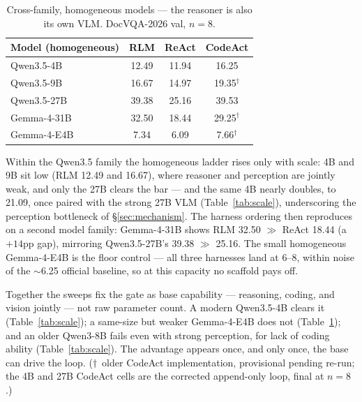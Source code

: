 \begin{table}[t]
\centering
\small
\begin{tabular}{lccc}
\toprule
Model (homogeneous) & RLM & ReAct & CodeAct \\
\midrule
Qwen3.5-4B & 12.49 & 11.94 & 16.25 \\
Qwen3.5-9B & 16.67 & 14.97 & 19.35$^\dag$ \\
Qwen3.5-27B & 39.38 & 25.16 & 39.53 \\
Gemma-4-31B & 32.50 & 18.44 & 29.25$^\dag$ \\
Gemma-4-E4B & 7.34 & 6.09 & 7.66$^\dag$ \\
\bottomrule
\end{tabular}
\caption{Cross-family, homogeneous models --- the reasoner is also its own VLM. DocVQA-2026 val, $n{=}8$.}
\label{tab:family}
\end{table}

Within the Qwen3.5 family the homogeneous ladder rises only with scale: 4B and 9B sit low (RLM 12.49 and 16.67), where reasoner and perception are jointly weak, and only the 27B clears the bar --- and the same 4B nearly doubles, to 21.09, once paired with the strong 27B VLM (Table~\ref{tab:scale}), underscoring the perception bottleneck of \S\ref{sec:mechanism}. The harness ordering then reproduces on a second model family: Gemma-4-31B shows RLM 32.50 $\gg$ ReAct 18.44 (a $+14$pp gap), mirroring Qwen3.5-27B's 39.38 $\gg$ 25.16. The small homogeneous Gemma-4-E4B is the floor control --- all three harnesses land at 6--8, within noise of the $\sim$6.25 official baseline, so at this capacity no scaffold pays off.

Together the sweeps fix the gate as base capability --- reasoning, coding, and vision jointly --- not raw parameter count. A modern Qwen3.5-4B clears it (Table~\ref{tab:scale}); a same-size but weaker Gemma-4-E4B does not (Table~\ref{tab:family}); and an older Qwen3-8B fails even with strong perception, for lack of coding ability (Table~\ref{tab:scale}). The advantage appears once, and only once, the base can drive the loop. ($\dag$~older CodeAct implementation, provisional pending re-run; the 4B and 27B CodeAct cells are the corrected append-only loop, final at $n{=}8$.)
